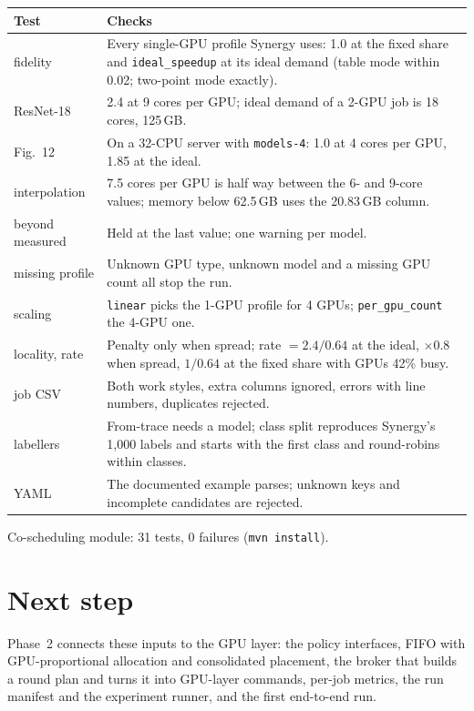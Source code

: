 \documentclass[11pt,a4paper]{article}
\newcommand{\code}[1]{\texttt{#1}}
\begin{document}
\begin{center}
\begin{tabularx}{\linewidth}{@{}lX@{}}
\toprule
Test & Checks \\
\midrule
fidelity & Every single-GPU profile Synergy uses: 1.0 at the fixed share and \code{ideal\_speedup} at its
  ideal demand (table mode within 0.02; two-point mode exactly). \\
ResNet-18 & 2.4 at 9 cores per GPU; ideal demand of a 2-GPU job is 18 cores, 125\,GB. \\
Fig.~12 & On a 32-CPU server with \code{models-4}: 1.0 at 4 cores per GPU, 1.85 at the ideal. \\
interpolation & 7.5 cores per GPU is half way between the 6- and 9-core values; memory below 62.5\,GB
  uses the 20.83\,GB column. \\
beyond measured & Held at the last value; one warning per model. \\
missing profile & Unknown GPU type, unknown model and a missing GPU count all stop the run. \\
scaling & \code{linear} picks the 1-GPU profile for 4 GPUs; \code{per\_gpu\_count} the 4-GPU one. \\
locality, rate & Penalty only when spread; rate $= 2.4/0.64$ at the ideal, $\times 0.8$ when spread,
  $1/0.64$ at the fixed share with GPUs 42\% busy. \\
job CSV & Both work styles, extra columns ignored, errors with line numbers, duplicates rejected. \\
labellers & From-trace needs a model; class split reproduces Synergy's 1,000 labels and starts with the
  first class and round-robins within classes. \\
YAML & The documented example parses; unknown keys and incomplete candidates are rejected. \\
\bottomrule
\end{tabularx}
\end{center}

Co-scheduling module: 31 tests, 0 failures (\code{mvn install}).

\section{Next step}
Phase~2 connects these inputs to the GPU layer: the policy interfaces, FIFO with GPU-proportional
allocation and consolidated placement, the broker that builds a round plan and turns it into GPU-layer
commands, per-job metrics, the run manifest and the experiment runner, and the first end-to-end run.
\end{document}
